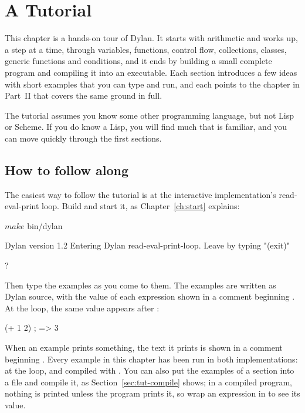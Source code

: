 \chapter{A Tutorial}\label{ch:tutorial}

This chapter is a hands-on tour of Dylan. It starts with arithmetic and
works up, a step at a time, through variables, functions, control flow,
collections, classes, generic functions and conditions, and it ends by
building a small complete program and compiling it into an executable.
Each section introduces a few ideas with short examples that you can type
and run, and each points to the chapter in Part~II that covers the same
ground in full.

The tutorial assumes you know some other programming language, but not
Lisp or Scheme. If you do know a Lisp, you will find much that is
familiar, and you can move quickly through the first sections.

\section{How to follow along}\label{sec:tut-follow}

The easiest way to follow the tutorial is at the interactive
implementation's read-eval-print loop. Build  and start it,
as Chapter~\ref{ch:start} explains:

\begin{repl}
$ make
$ bin/dylan

Dylan version 1.2
Entering Dylan read-eval-print-loop.
Leave by typing "(exit)"

?
\end{repl}

Then type the examples as you come to them. The examples are written as
Dylan source, with the value of each expression shown in a comment
beginning \code{; =>}. At the loop, the same value appears after
:

\begin{dylan}
(+ 1 2)   ; => 3
\end{dylan}

When an example prints something, the text it prints is shown in a
comment beginning . Every example in this chapter has been
run in both implementations: at the loop, and compiled with .
You can also put the examples of a section into a file and compile it, as
Section~\ref{sec:tut-compile} shows; in a compiled program, nothing is
printed unless the program prints it, so wrap an expression in
 to see its value.

